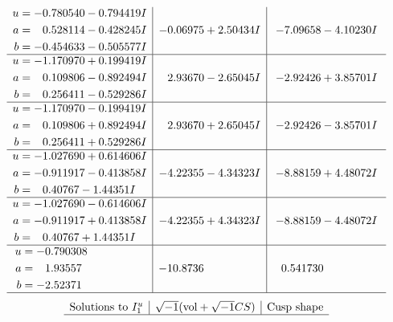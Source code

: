 \documentclass[1p]{elsarticle_modified}
\theoremstyle{definition}
\newcommand{\I}{\sqrt{-1}}
\begin{document}
$$\begin{array}{c|c|c}
\begin{aligned}
u &= -0.780540 - 0.794419 I \\
a &= \phantom{-}0.528114 - 0.428245 I \\
b &= -0.454633 - 0.505577 I\end{aligned}
 & -0.06975 + 2.50434 I & -7.09658 - 4.10230 I \\ \hline\begin{aligned}
u &= -1.170970 + 0.199419 I \\
a &= \phantom{-}0.109806 - 0.892494 I \\
b &= \phantom{-}0.256411 - 0.529286 I\end{aligned}
 & \phantom{-}2.93670 - 2.65045 I & -2.92426 + 3.85701 I \\ \hline\begin{aligned}
u &= -1.170970 - 0.199419 I \\
a &= \phantom{-}0.109806 + 0.892494 I \\
b &= \phantom{-}0.256411 + 0.529286 I\end{aligned}
 & \phantom{-}2.93670 + 2.65045 I & -2.92426 - 3.85701 I \\ \hline\begin{aligned}
u &= -1.027690 + 0.614606 I \\
a &= -0.911917 - 0.413858 I \\
b &= \phantom{-}0.40767 - 1.44351 I\end{aligned}
 & -4.22355 - 4.34323 I & -8.88159 + 4.48072 I \\ \hline\begin{aligned}
u &= -1.027690 - 0.614606 I \\
a &= -0.911917 + 0.413858 I \\
b &= \phantom{-}0.40767 + 1.44351 I\end{aligned}
 & -4.22355 + 4.34323 I & -8.88159 - 4.48072 I \\ \hline\begin{aligned}
u &= -0.790308\phantom{ +0.000000I} \\
a &= \phantom{-}1.93557\phantom{ +0.000000I} \\
b &= -2.52371\phantom{ +0.000000I}\end{aligned}
 & -10.8736\phantom{ +0.000000I} & \phantom{-}0.541730\phantom{ +0.000000I}\\
 \hline 
 \end{array}$$\newpage$$\begin{array}{c|c|c}  
\text{Solutions to }I^u_{1}& \I (\text{vol} + \sqrt{-1}CS) & \text{Cusp shape}\\
 \hline 

\end{array}$$
\end{document}
